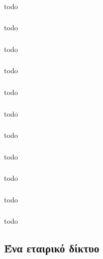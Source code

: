 \documentclass[a4paper, 12pt]{article}
\begin{document}
		\subsubsection{}
			todo

		\subsubsection{}
			todo

		\subsubsection{}
			todo

		\subsubsection{}
			todo

		\subsubsection{}
			todo

		\subsubsection{}
			todo

		\subsubsection{}
			todo

		\subsubsection{}
			todo

		\subsubsection{}
			todo

		\subsubsection{}
			todo

		\subsubsection{}
			todo

	\subsection{Ένα εταιρικό δίκτυο}
\end{document}
